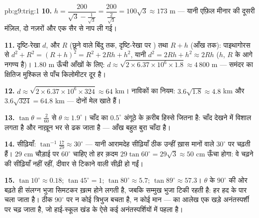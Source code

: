 \begin{solution}{pb:g9:trig:1}
\textbf{10.} $h = \dfrac{200}{\sqrt3 - \frac{1}{\sqrt3}}
= \dfrac{200}{\frac{2}{\sqrt3}} = 100\sqrt3 \approx 173$ m ---
यानी एफ़िल मीनार की दूसरी मंज़िल, दो नज़रों और एक सैर से नाप ली
गई।

\textbf{11.} दृष्टि-रेखा $d$, और  $R$ (छूने वाले बिंदु
तक, दृष्टि-रेखा पर ) तथा $R + h$ (आँख तक): पाइथागोरस से
$d^2 + R^2 = (R + h)^2 = R^2 + 2Rh + h^2$, यानी
$d^2 = 2Rh + h^2 \approx 2Rh$ ($h$, $R$ के आगे नगण्य है)। $1.80$ m
ऊँची आँखों के लिए:
$d \approx \sqrt{2 \times 6.37 \times 10^6 \times 1.8}
\approx 4\,800$ m --- समंदर का क्षितिज मुश्किल से पाँच किलोमीटर
दूर है।

\textbf{12.} $d \approx \sqrt{2 \times 6.37 \times 10^6 \times
324} \approx 64$ km। नाविकों का नियम: $3.6\sqrt{1.8} \approx
4.8$ km और $3.6\sqrt{324} = 64.8$ km --- दोनों मेल खाते हैं।

\textbf{13.} $\tan\theta = \frac{2}{60}$ से $\theta \approx
1.9^\circ$। चाँद का $0.5^\circ$ अंगूठे के क़रीब \emph{}
हिस्से जितना है: चाँद देखने में विशाल लगता है और नाख़ून भर से ढक
जाता है --- आँख बहुत बुरा चाँदा है।

\textbf{14.} सीढ़ियाँ: $\tan^{-1}\frac{17}{29} \approx 30^\circ$
--- यानी आरामदेह सीढ़ियाँ ठीक उन्हीं ख़ास मानों वाले $30^\circ$ पर
चढ़ती हैं। $29$ cm चौड़ाई पर $60^\circ$ चाहिए तो हर क़दम
$29\tan 60^\circ = 29\sqrt3 \approx 50$ cm ऊँचा होगा: वे चढ़ने की
सीढ़ियाँ नहीं रहीं, दीवार से टिकाने वाली सीढ़ी हो गईं।

\textbf{15.} $\tan 10^\circ \approx 0.18$;
$\tan 45^\circ = 1$; $\tan 80^\circ \approx 5.7$;
$\tan 89^\circ \approx 57.3$। $\theta$ के $90^\circ$ की ओर बढ़ते
ही संलग्न भुजा सिमटकर ख़त्म होने लगती है, जबकि सम्मुख भुजा टिकी
रहती है:  हर हद के पार चला जाता है। ठीक $90^\circ$ पर न कोई
त्रिभुज बचता है, न कोई मान ---  का आलेख एक खड़े
अनंतस्पर्शी पर चढ़ जाता है, जो हाई-स्कूल खंड के ऐसे कई
अनंतस्पर्शियों में पहला है।

\end{solution}
